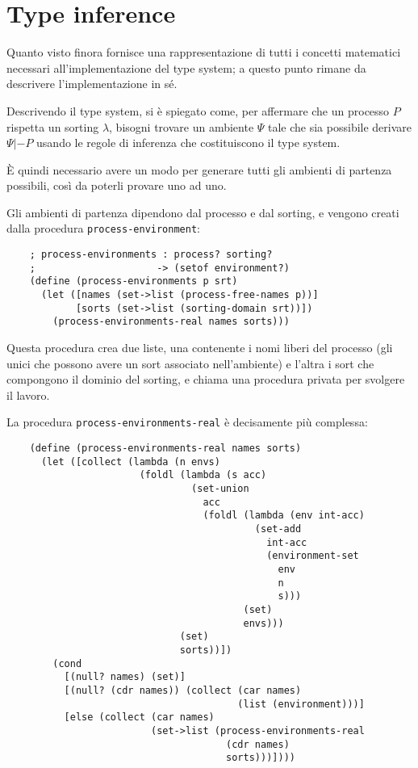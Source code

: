 \chapter{Type inference}

Quanto visto finora fornisce una rappresentazione di tutti i concetti
matematici necessari all'implementazione del type system; a questo punto
rimane da descrivere l'implementazione in s\'e.

Descrivendo il type system, si \`e spiegato come, per affermare che
un processo $P$ rispetta un sorting $\lambda$, bisogni trovare un
ambiente $\Psi$ tale che sia possibile derivare $\Psi |- P$ usando le
regole di inferenza che costituiscono il type system.

\`E quindi necessario avere un modo per generare tutti gli ambienti
di partenza possibili, cos\`i da poterli provare uno ad uno.

Gli ambienti di partenza dipendono dal processo e dal sorting, e vengono
creati dalla procedura \lstinline{process-environment}:

\begin{lstlisting}
    ; process-environments : process? sorting?
    ;                     -> (setof environment?)
    (define (process-environments p srt)
      (let ([names (set->list (process-free-names p))]
            [sorts (set->list (sorting-domain srt))])
        (process-environments-real names sorts)))
\end{lstlisting}

Questa procedura crea due liste, una contenente i nomi liberi del
processo (gli unici che possono avere un sort associato nell'ambiente)
e l'altra i sort che compongono il dominio del sorting, e chiama una
procedura privata per svolgere il lavoro.

La procedura \lstinline{process-environments-real} \`e decisamente
pi\`u complessa:

\begin{lstlisting}
    (define (process-environments-real names sorts)
      (let ([collect (lambda (n envs)
                       (foldl (lambda (s acc)
                                (set-union
                                  acc
                                  (foldl (lambda (env int-acc)
                                           (set-add
                                             int-acc
                                             (environment-set
                                               env
                                               n
                                               s)))
                                         (set)
                                         envs)))
                              (set)
                              sorts))])
        (cond
          [(null? names) (set)]
          [(null? (cdr names)) (collect (car names)
                                        (list (environment)))]
          [else (collect (car names)
                         (set->list (process-environments-real
                                      (cdr names)
                                      sorts)))])))
\end{lstlisting}

